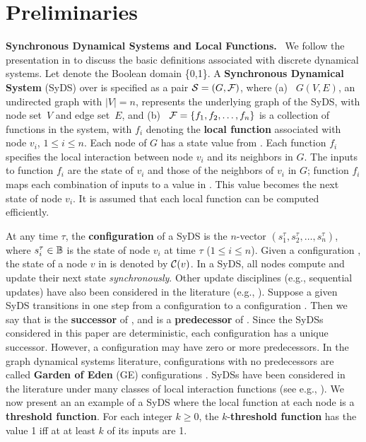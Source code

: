 \section{Preliminaries}
\label{sec:prelim}

\textbf{Synchronous Dynamical Systems and Local Functions.}~
We follow the presentation in \cite{BH+07} to discuss
the basic definitions associated with discrete dynamical systems.
Let \bbb{} denote the Boolean domain \{0,1\}.
A \textbf{Synchronous Dynamical System} (SyDS)
\cals{} over \bbb{} is specified as
a pair ${\cal S}  = (G, {\cal F})$, where 
(a)~ $G(V,E)$, an undirected graph with $|V| = n$, 
represents the underlying graph of the SyDS,
with node set~$V$ and edge set~$E$, and 
(b)~ ${\cal F} = \{f_1, f_2, \ldots, f_n \}$ is a collection of
functions in the system, with
$f_i$ denoting the \textbf{local function} 
associated with node $v_i$, $1 \leq i \leq n$.
Each node of $G$ has a state value from \bbb. 
Each function $f_i$ specifies the local interaction
between node $v_i$ and its neighbors in $G$.
The inputs to function $f_i$ are the state of $v_i$ and
those of the neighbors of $v_i$ in $G$; function $f_i$ maps 
each combination of inputs to a value in \bbb.
This value becomes the next state of node $v_i$. 
It is assumed that each local function can be computed efficiently.

At any time $\tau$, 
the {\bf configuration} \calc{} of a SyDS 
is the $n$-vector $(s_1^{\tau}, s_2^{\tau}, \ldots, s_n^{\tau})$,
where $s_i^{\tau} \in \mbox{$\mathbb{B}$}$ is the state of
node $v_i$ at time $\tau$ ($1 \leq i \leq n$).
Given a configuration \calc, the state of a node $v$ in \calc{}
is denoted by $\mbox{$\mathcal{C}$}(v)$.
In a SyDS, all nodes compute and update their next state  
\emph{synchronously}.
Other update disciplines (e.g., sequential updates) 
have also been considered in the literature (e.g., \cite{BH+07}).
Suppose a given SyDS transitions in one step from
a configuration \calcp{} to a configuration \calc.
Then we say that \calc{} is the \textbf{successor} of \calcp,
and \calcp{} is a \textbf{predecessor} of \calc.
Since the SyDSs considered in this paper are deterministic,
each configuration has a unique successor.
However, a configuration may have zero
or more predecessors.
In the graph dynamical systems literature, configurations with 
no predecessors are called \textbf{Garden of Eden}
(GE) configurations \cite{MR-2007}.
SyDSs have been considered in the literature under many 
classes of local interaction functions 
(see e.g., \cite{BH+11,Kawachi-et-al-2017}).
We now present an an example of a SyDS where the local function
at each node is a \textbf{threshold function}. 
For each integer $k \geq 0$, the $k$-\textbf{threshold function} has the
value 1 iff at at least $k$ of its inputs are 1.

